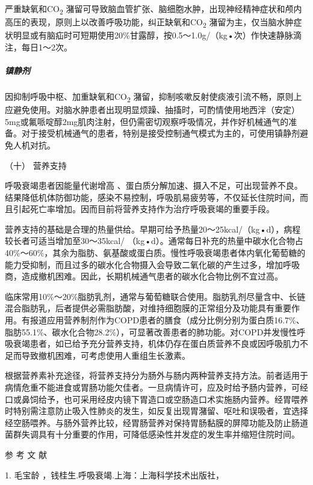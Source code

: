 严重缺氧和CO\textsubscript{2}
潴留可导致脑血管扩张、脑细胞水肿，出现神经精神症状和颅内高压的表现，原则上以改善呼吸功能，纠正缺氧和CO\textsubscript{2}
潴留为主，仅当脑水肿症状明显或有脑疝时可短期使用20\%甘露醇，按0.5～1.0g/（kg•次）作快速静脉滴注，每日1～2次。

\subparagraph{镇静剂}

因抑制呼吸中枢、加重缺氧和CO\textsubscript{2}
潴留，抑制咳嗽反射使痰液引流不畅，原则上应避免使用。对脑水肿患者出现明显烦躁、抽搐时，可酌情使用地西泮（安定）5mg或氟哌啶醇2mg肌肉注射，但仍需密切观察呼吸情况，并作好机械通气的准备。对于接受机械通气的患者，特别是接受控制通气模式为主的，可使用镇静剂避免人机对抗。

\hypertarget{text00076.htmlux5cux23CHP3-4-3-2-10}{}
（十） 营养支持

呼吸衰竭患者因能量代谢增高
、蛋白质分解加速、摄入不足，可出现营养不良。结果降低机体防御功能，感染不易控制，呼吸肌易疲劳等，不仅延长住院时间，而且引起死亡率增加。因而目前将营养支持作为治疗呼吸衰竭的重要手段。

营养支持的基础是合理的热量供给。早期可给予热量20～25kcal/（kg•d），病程较长者可适当增加至30～35kcal/
（kg•d）。通常每日补充的热量中碳水化合物占40\%～60\%，其余为脂肪、氨基酸或蛋白质。慢性呼吸衰竭患者体内氧化葡萄糖的能力受抑制，而且过多的碳水化合物摄入会导致二氧化碳的产生过多，增加呼吸商，造成撤机困难。因此，长期机械通气患者的碳水化合物比例不宜过高。

临床常用10\%～20\%脂肪乳剂，通常与葡萄糖联合使用。脂肪乳剂尽量含中、长链混合脂肪乳，后者提供必需脂肪酸，对维持细胞膜的正常组分及功能具有重要作用。有报道应用营养制剂作为COPD患者的膳食（成分比例分别为蛋白质16.7\%、脂肪55.1\%、碳水化合物28.2\%），可显著改善患者的肺功能。对COPD并发慢性呼吸衰竭患者，如已给予充分营养支持，机体仍存在蛋白质营养不良或因呼吸肌力不足而导致撤机困难，可考虑使用人重组生长激素。

根据营养素补充途径，将营养支持分为肠外与肠内两种营养支持方法。前者适用于病情危重不能进食或胃肠功能欠佳者。一旦病情许可，应及时给予肠内营养，可经口或鼻饲给予，也可采用经皮内镜下胃造口或空肠造口术实施肠内营养。经胃喂养时特别需注意防止吸入性肺炎的发生，如反复出现胃潴留、呕吐和误吸者，宜选择经空肠喂养。与肠外营养比较，经胃肠营养对保持胃肠黏膜的屏障功能及防止肠道菌群失调具有十分重要的作用，可降低感染性并发症的发生率并缩短住院时间。

\protect\hypertarget{text00077.html}{}{}

\hypertarget{text00077.htmlux5cux23CHP3-4-4}{}
参 考 文 献

1. 毛宝龄 ，钱桂生.呼吸衰竭.上海：上海科学技术出版社，

